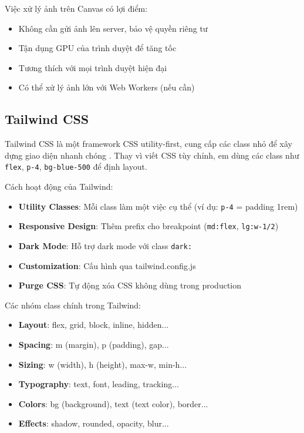 Việc xử lý ảnh trên Canvas có lợi điểm:
\begin{itemize}
  \item Không cần gửi ảnh lên server, bảo vệ quyền riêng tư
  \item Tận dụng GPU của trình duyệt để tăng tốc
  \item Tương thích với mọi trình duyệt hiện đại
  \item Có thể xử lý ảnh lớn với Web Workers (nếu cần)
\end{itemize}

\subsection{Tailwind CSS}
Tailwind CSS là một framework CSS utility-first, cung cấp các class nhỏ để xây dựng giao diện nhanh chóng \cite{tailwind}. Thay vì viết CSS tùy chỉnh, em dùng các class như \texttt{flex}, \texttt{p-4}, \texttt{bg-blue-500} để định layout.

Cách hoạt động của Tailwind:
\begin{itemize}
  \item \textbf{Utility Classes}: Mỗi class làm một việc cụ thể (ví dụ: \texttt{p-4} = padding 1rem)
  \item \textbf{Responsive Design}: Thêm prefix cho breakpoint (\texttt{md:flex}, \texttt{lg:w-1/2})
  \item \textbf{Dark Mode}: Hỗ trợ dark mode với class \texttt{dark:}
  \item \textbf{Customization}: Cấu hình qua tailwind.config.js
  \item \textbf{Purge CSS}: Tự động xóa CSS không dùng trong production
\end{itemize}

Các nhóm class chính trong Tailwind:
\begin{itemize}
  \item \textbf{Layout}: flex, grid, block, inline, hidden...
  \item \textbf{Spacing}: m (margin), p (padding), gap...
  \item \textbf{Sizing}: w (width), h (height), max-w, min-h...
  \item \textbf{Typography}: text, font, leading, tracking...
  \item \textbf{Colors}: bg (background), text (text color), border...
  \item \textbf{Effects}: shadow, rounded, opacity, blur...
\end{itemize}

